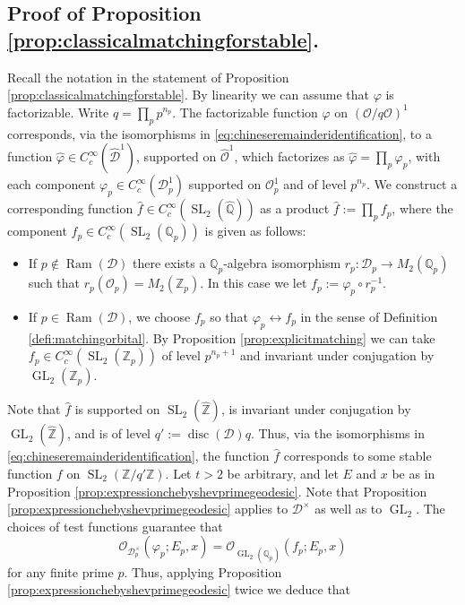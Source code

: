 \documentclass{article}
\theoremstyle{named}
\newcommand{\D}{\mathcal{D}}
\newcommand{\Z}{\mathbb{Z}}
\newcommand{\Q}{\mathbb{Q}}
\renewcommand{\O}{\mathcal{O}}
\DeclareMathOperator{\SL}{SL}
\DeclareMathOperator{\GL}{GL}
\DeclareMathOperator{\disc}{disc}
\DeclareMathOperator{\Ram}{Ram}
\begin{document}
\subsection{Proof of Proposition \ref{prop:classicalmatchingforstable}.}\label{subsec:proofofclassicalmatching}
Recall the notation in the statement of Proposition \ref{prop:classicalmatchingforstable}.
By linearity we can assume that $\varphi$ is factorizable. Write $q = \prod_{p}p^{n_p}$. The factorizable function $\varphi$ on $(\O/q\O)^1$ corresponds, via the isomorphisms in \eqref{eq:chineseremainderidentification}, to a function $\widehat{\varphi} \in C_c^\infty(\widehat{\D}^1)$, supported on $\widehat{\O}^1$, which factorizes as $\widehat{\varphi} = \prod_p \varphi_p$, with each component $\varphi_p \in C_c^\infty(\D^1_p)$ supported on $\O_p^1$ and of level $p^{n_p}$. We construct a corresponding function $\widehat{f} \in C_c^\infty(\SL_2(\widehat{\Q}))$ as a product $\widehat{f} := \prod_p f_p$, where the component $f_p \in C_c^\infty(\SL_2(\Q_p))$ is given as follows:
\begin{itemize}
    \item If $p \not \in \Ram(\D)$ there exists a $\Q_p$-algebra isomorphism $r_p: \D_p \rightarrow M_2(\Q_p)$ such that $r_p(\O_p) = M_2(\Z_p)$. In this case we let $f_p := \varphi_p \circ r_p^{-1}$. 
    \item If $p \in \Ram(\D)$, we choose $f_p$ so that $\varphi_p \leftrightarrow f_p$ in the sense of Definition \ref{defi:matchingorbital}. By Proposition \ref{prop:explicitmatching} we can take $f_p \in C_c^\infty(\SL_2(\Z_p))$ of level $p^{n_p + 1}$ and invariant under conjugation by $\GL_2(\Z_p)$.
\end{itemize}
Note that $\widehat{f}$ is supported on $\SL_2(\widehat{\Z})$, is invariant under conjugation by $\GL_2(\widehat{\Z})$, and is of level $q' := \disc(\D)q$. Thus, via the isomorphisms in \eqref{eq:chineseremainderidentification}, the function $\widehat{f}$ corresponds to some stable function $f$ on $\SL_2(\Z/q'\Z)$. Let $t > 2$ be arbitrary, and let $E$ and $x$ be as in Proposition \ref{prop:expressionchebyshevprimegeodesic}. 
Note that Proposition \ref{prop:expressionchebyshevprimegeodesic} applies to $\D^\times$ as well as to $\GL_2$. The choices of test functions guarantee that   
\begin{equation*}
    \O_{\D_p^\times}(\varphi_p; E_p, x) = \O_{\GL_2(\Q_p)}(f_p; E_p, x)
\end{equation*}
for any finite prime $p$. Thus, applying Proposition \ref{prop:expressionchebyshevprimegeodesic} twice we deduce that  
\end{document}

